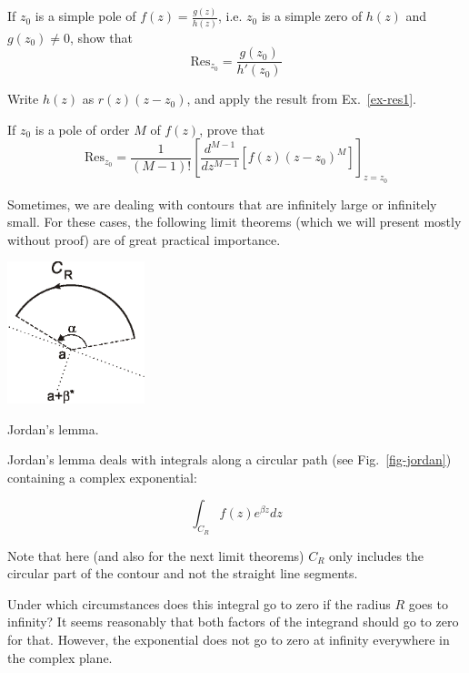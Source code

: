 \begin{exer}
  If $z_0$ is a simple pole of $f(z)=\frac{g(z)}{h(z)}$, i.e. $z_0$ is a simple zero of $h(z)$ and $g(z_0) \ne 0$, show that
    $$\mathrm{Res}_{z_0} = \frac{g(z_0)}{h'(z_0)}$$
\begin{hnt}
Write $h(z)$ as $r(z)(z-z_0)$, and apply the result from Ex.~\ref{ex-res1}.
\end{hnt}
\end{exer}

\begin{exer}
If $z_0$ is a pole of order $M$ of $f(z)$, prove that
$$\mathrm{Res}_{z_0} = \frac{1}{(M-1)!}{\left[\frac{d^{M-1}}{dz^{M-1}}[f(z)(z-z_0)^M]\right]}_{z=z_0}$$
\end{exer}


\pagebreak


\label{week2}

Sometimes, we are dealing with contours that are infinitely large or infinitely small. For these cases, the following limit theorems (which we will present mostly without proof) are of great practical importance.


\begin{marginfigure}
\centering
\includegraphics[width=4cm]{complex/figures/jordan}
\caption{Jordan's lemma.}
\label{fig-jordan}
\end{marginfigure}

Jordan's lemma deals with integrals along a circular path  (see Fig.~\ref{fig-jordan}) containing a complex exponential: 

$$ \int_{{C}_R} f(z) e^{\beta z} dz$$

Note that here (and also for the next limit theorems) ${{C}_R}$ only includes the circular part of the contour and not the straight line segments.

Under which circumstances does this integral go to zero if the radius $R$ goes to infinity? It seems reasonably that both factors of the integrand should go to zero for that. However, the exponential does not go to zero at infinity everywhere in the complex plane. 

